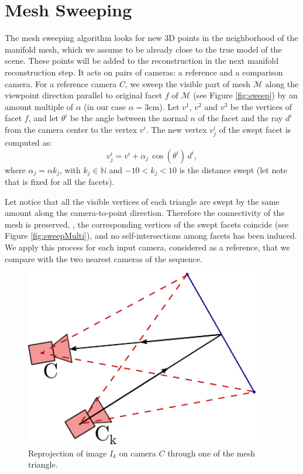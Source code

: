  

\section{Mesh Sweeping}
\label{sec:sweep}
The mesh sweeping algorithm looks for new 3D points in the neighborhood of the manifold mesh, which we assume to be already close to the true model of the scene.
These points will be added to the reconstruction in the next manifold reconstruction step.
It acts on pairs of cameras: a reference  and a comparison camera. 
For a reference camera $C$, we sweep the visible part of mesh $\mathcal{M}$ along the viewpoint direction parallel to original facet $f$ of $\mathcal{M}$ (see Figure \ref{fig:sweep}) by an amount multiple of $\alpha$ (in our case $\alpha = 3$cm).
Let $v^1$, $v^2$ and $v^3$ be the vertices of facet $f$, and let $\theta^i$ be the angle between the normal $n$ of the facet and the ray $d^i$ from the camera center to the vertex $v^i$. 
The new vertex $v_j^i$ of the swept facet is computed as:
\begin{equation}
v_j^i = v^i + \alpha_j \, \cos (\theta^i) \, d^i,
\end{equation}
where $\alpha_j = \alpha  k_j$, with $k_j \in \mathbb{N}$ and $-10< k_j <10$ is the distance swept (let note that is fixed for all the facets).

Let notice that all the visible vertices of each triangle are swept by the same amount along the camera-to-point direction. 
Therefore the connectivity of the mesh is preserved, \ie, the corresponding vertices of the swept facets coincide (see Figure \ref{fig:sweepMulti}),  and no self-intersections among facets has been induced. 
We apply this process for each input camera, considered as a reference, that we compare with the two nearest cameras of the sequence.



\begin{figure}[t]
\centering
\includegraphics[width=0.92\textwidth]{./img/ch-sweep/sweepingBase}
\caption{Reprojection of image $I_k$ on camera $C$ through one of the mesh triangle.}
\label{fig:stereo}
\end{figure}

